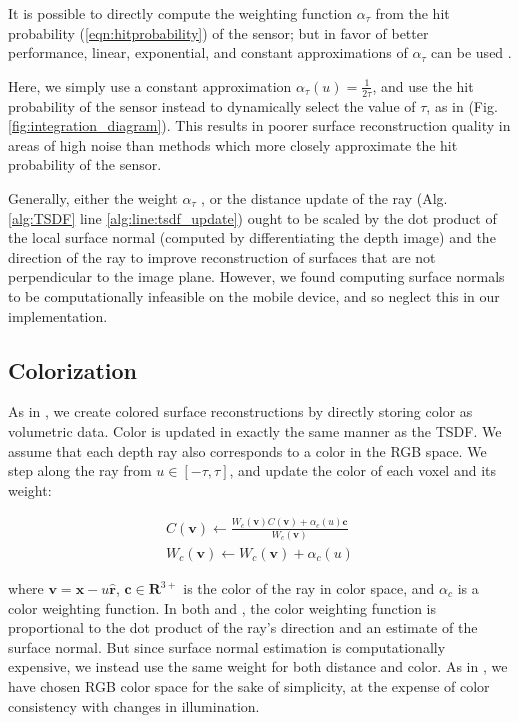 \documentclass[conference]{IEEEtran}
\newcommand{\eref}[1]{(\ref{#1})}
\newcommand{\figref}[1]{Fig.\ref{#1}}
\newcommand{\algoref}[1]{Alg.\ref{#1}}
\newcommand{\TSDF}{TSDF\xspace}
\begin{document}
 It is possible \cite{Nguyen2012} to directly compute the weighting function
 $\alpha_{\tau}$ from the hit probability \eref{eqn:hitprobability} of the
 sensor; but in favor of better performance, linear, exponential, and constant
 approximations of $\alpha_{\tau}$ can be used \cite{Curless1996, Newcombe,
 Whelan2013, Bylow2013}.

Here, we simply use a constant approximation $\alpha_{\tau}(u) = \frac{1}{2
\tau}$, and use the hit probability of the sensor instead to  dynamically select
the value of $\tau$, as in \cite{Nguyen2012} (\figref{fig:integration_diagram}).
This results in poorer surface reconstruction quality in areas of high noise
than methods which more closely approximate the hit probability of the sensor.

Generally, either the weight $\alpha_{\tau}$ \cite{Newcombe, Whelan2013}, or
the distance update of the ray (\algoref{alg:TSDF} line
\ref{alg:line:tsdf_update}) \cite{Curless1996, Bylow2013} ought to be scaled by
the dot product of the local surface normal (computed by differentiating the
depth image) and the direction of the ray to improve reconstruction of surfaces
that are not perpendicular to the image plane. However, we found computing
surface normals to be computationally infeasible on the mobile device, and so
neglect this in our implementation.

\subsection{Colorization}
\label{section:color}
As in \cite{Bylow2013, Whelan2013}, we create colored surface reconstructions by
directly storing color as volumetric data. Color is updated in exactly the same
manner as the \TSDF.  We assume that each depth ray also corresponds to a color
in the RGB space. We step along the ray from $u \in [-\tau, \tau]$, and update
the color of each voxel and its weight:

\begin{align}
C(\mathbf{v}) \gets \frac{W_c(\mathbf{v}) C(\mathbf{v}) +
\alpha_c(u) \mathbf{c}}{W_c(\mathbf{v})}
\\
%
W_c(\mathbf{v}) \gets W_c(\mathbf{v}) + \alpha_c(u)
\end{align}

\noindent where $\mathbf{v} = \mathbf{x} - u\mathbf{\hat{r}}$,  $\mathbf{c}
\in \mathbf{R}^{3+}$ is the color of the ray in color space, and $\alpha_c$ is a
color weighting function. In both \cite{Bylow2013} and \cite{Whelan2013}, the
color weighting function is proportional to the dot product of the ray's
direction and an estimate of the surface normal. But since surface normal
estimation is computationally expensive, we instead use the same weight for
both distance and color. As in \cite{Bylow2013},
we have chosen RGB color space for the sake of simplicity, at the expense of
color consistency with changes in illumination.
\end{document}

